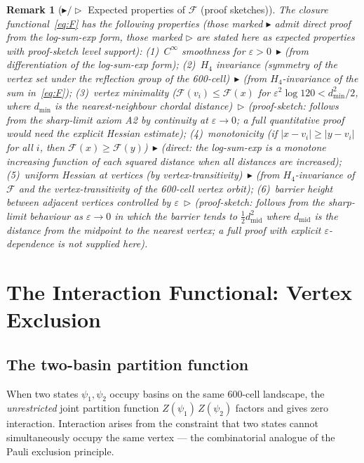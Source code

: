 \documentclass[12pt]{article}
\newtheorem{remark}[theorem]{Remark}
\newcommand{\Fcal}{\mathcal{F}}
\begin{document}
\begin{remark}[$\blacktriangleright / \triangleright$ Expected properties of $\Fcal$ (proof sketches)]\label{prop:properties}
The closure functional~\eqref{eq:F} has the following properties (those marked $\blacktriangleright$ admit direct proof from the log-sum-exp form, those marked $\triangleright$ are stated here as expected properties with proof-sketch level support): (1)~$C^\infty$ smoothness for $\varepsilon > 0$~$\blacktriangleright$ (from differentiation of the log-sum-exp form); (2)~$H_4$ invariance (symmetry of the vertex set under the reflection group of the 600-cell)~$\blacktriangleright$ (from $H_4$-invariance of the sum in~\eqref{eq:F}); (3)~vertex minimality ($\Fcal(v_i) \leq \Fcal(x)$ for $\varepsilon^2\log 120 < d_{\min}^2/2$, where $d_{\min}$ is the nearest-neighbour chordal distance)~$\triangleright$ (proof-sketch: follows from the sharp-limit axiom A2 by continuity at $\varepsilon \to 0$; a full quantitative proof would need the explicit Hessian estimate); (4)~monotonicity (if $|x - v_i| \geq |y - v_i|$ for all $i$, then $\Fcal(x) \geq \Fcal(y)$)~$\blacktriangleright$ (direct: the log-sum-exp is a monotone increasing function of each squared distance when all distances are increased); (5)~uniform Hessian at vertices (by vertex-transitivity)~$\blacktriangleright$ (from $H_4$-invariance of $\Fcal$ and the vertex-transitivity of the 600-cell vertex orbit); (6)~barrier height between adjacent vertices controlled by $\varepsilon$~$\triangleright$ (proof-sketch: follows from the sharp-limit behaviour as $\varepsilon \to 0$ in which the barrier tends to $\tfrac{1}{2}d_{\mathrm{mid}}^2$ where $d_{\mathrm{mid}}$ is the distance from the midpoint to the nearest vertex; a full proof with explicit $\varepsilon$-dependence is not supplied here).
\end{remark}

\section{The Interaction Functional: Vertex Exclusion}\label{sec:Fint}

\subsection{The two-basin partition function}

When two states $\psi_1, \psi_2$ occupy basins on the same 600-cell
landscape, the \textit{unrestricted} joint partition function
$Z(\psi_1)\,Z(\psi_2)$ factors and gives zero interaction. Interaction
arises from the constraint that two states cannot simultaneously
occupy the same vertex --- the combinatorial analogue of the Pauli
exclusion principle.
\end{document}

